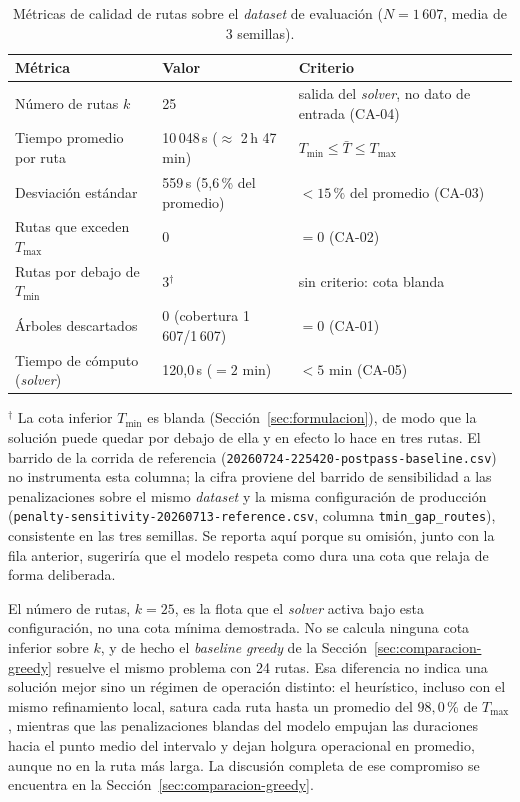 \begin{table}[H]
  \centering
  \caption{Métricas de calidad de rutas sobre el \textit{dataset} de evaluación ($N=1\,607$, media de 3 semillas).}
  \label{tab:metricas}
  \begin{tabularx}{\textwidth}{lXX}
    \toprule
    Métrica & Valor & Criterio \\
    \midrule
    Número de rutas $k$ & 25 & salida del \textit{solver}, no dato de entrada (CA-04) \\
    Tiempo promedio por ruta & 10\,048\,s ($\approx$ 2\,h 47\,min) & $T_{\min} \leq \bar{T} \leq T_{\max}$ \\
    Desviación estándar & 559\,s (5{,}6\,\% del promedio) & $< 15\,\%$ del promedio (CA-03) \\
    Rutas que exceden $T_{\max}$ & 0 & $= 0$ (CA-02) \\
    Rutas por debajo de $T_{\min}$ & 3$^{\dagger}$ & sin criterio: cota blanda \\
    Árboles descartados & 0 (cobertura 1\,607/1\,607) & $= 0$ (CA-01) \\
    Tiempo de cómputo (\textit{solver}) & 120{,}0\,s ($= 2$ min) & $< 5$ min (CA-05) \\
    \bottomrule
  \end{tabularx}
\end{table}

\begin{sloppypar}
{\footnotesize$^{\dagger}$ La cota inferior $T_{\min}$ es blanda
(Sección~\ref{sec:formulacion}), de modo que la solución puede quedar por debajo de
ella y en efecto lo hace en tres rutas. El barrido de la corrida de referencia
(\texttt{20260724-225420-postpass-baseline.csv}) no instrumenta esta columna; la
cifra proviene del barrido de sensibilidad a las penalizaciones sobre el mismo
\textit{dataset} y la misma configuración de producción
(\texttt{penalty-sensitivity-20260713-reference.csv}, columna
\texttt{tmin\_gap\_routes}), consistente en las tres semillas. Se reporta aquí
porque su omisión, junto con la fila anterior, sugeriría que el modelo respeta como
dura una cota que relaja de forma deliberada.}
\end{sloppypar}

El número de rutas, $k=25$, es la flota que el
\textit{solver} activa bajo esta configuración, no una cota mínima demostrada. No
se calcula ninguna cota inferior sobre $k$, y de hecho el \textit{baseline}
\textit{greedy} de la Sección~\ref{sec:comparacion-greedy} resuelve el mismo problema
con 24 rutas. Esa diferencia no indica una solución mejor sino un régimen de
operación distinto: el heurístico, incluso con el mismo refinamiento local, satura cada ruta hasta un promedio del
$98{,}0$\,\% de $T_{\max}$, mientras que las penalizaciones blandas del modelo
empujan las duraciones hacia el punto medio del intervalo y dejan holgura
operacional en promedio, aunque no en la ruta más larga. La
discusión completa de ese compromiso se encuentra en la
Sección~\ref{sec:comparacion-greedy}.

